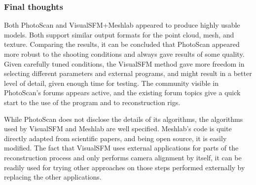 \subsubsection{Final thoughts}

Both PhotoScan and VisualSFM+Meshlab appeared to produce highly usable models.
Both support similar output formats for the point cloud, mesh, and texture.
Comparing the results, it can be concluded that PhotoScan appeared more robust to the shooting conditions and always gave results of some quality.
Given carefully tuned conditions, the VisualSFM method gave more freedom in selecting different parameters and external programs, and might result in a better level of detail, given enough time for testing.
The community visible in PhotoScan's forums \cite{agisoftforum} appears active, and the existing forum topics give a quick start to the use of the program and to reconstruction rigs.

While PhotoScan does not disclose the details of its algorithms, the algorithms used by VisualSFM and Meshlab are well specified.
Meshlab's code is quite directly adapted from scientific papers, and being open source, it is easily modified.
The fact that VisualSFM uses external applications for parts of the reconstruction process and only performs camera alignment by itself, it can be readily used for trying other approaches on those steps performed externally by replacing the other applications.

